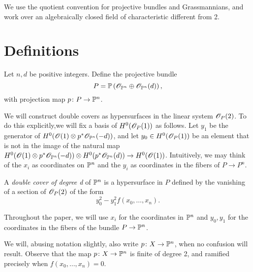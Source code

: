We use the quotient convention for projective bundles and Grassmannians, and work over an algebraically closed field of characteristic different from 2.

\section{Definitions}
\begin{definition}
  \label{def:DoubleCover1}
  Let $n, d$ be positive integers. Define the projective bundle
\[P = \P\left(\sO_{\P^n} \oplus \sO_{\P^n}(d)\right),\]
with projection map $p \from P \to \P^n$.

We will construct double covers as hypersurfaces in the linear system $\sO_P(2)$. To do this explicitly,we will fix a basis of $H^0(\sO_P(1))$ as follows. Let $y_1$ be the generator of $H^0(\sO(1) \otimes p^* \sO_{\P^n}(-d))$, and let $y_0 \in H^0(\sO_P(1))$ be an element that is not in the image of the natural map $H^0(\sO(1) \otimes p^* \sO_{\P^n}(-d)) \otimes H^0(p^* \sO_{\P^n}(d)) \to H^0(\sO(1))$. Intuitively, we may think of the $x_i$ as coordinates on $\P^n$ and the $y_i$ as coordinates in the fibers of $P \to P^n$.

A \emph{double cover of degree d} of $\P^n$ is a hypersurface in $P$ defined by the vanishing of a section of $\sO_P(2)$ of the form
\begin{equation}
	\label{eq:DoubleCoverDefinition}
	y_0^2 - y_1^2f(x_0,\dots,x_n).
\end{equation}
\end{definition}
Throughout the paper, we will use $x_i$ for the coordinates in $\P^n$ and $y_0,y_1$ for the coordinates in the fibers of the bundle $P \to \P^n$.

We will, abusing notation slightly, also write $p \from X \to \P^n$, when no confusion will result. Observe that the map $p \from X \to \P^n$ is finite of degree 2, and ramified precisely when $f(x_0,\dots,x_n) = 0$.
%

